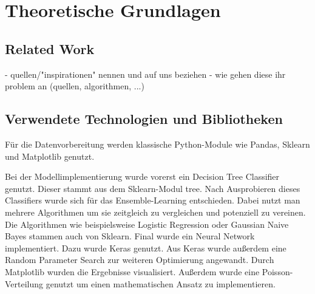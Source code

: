 \chapter{Theoretische Grundlagen}

\section{Related Work}
- quellen/"inspirationen" nennen und auf uns beziehen
- wie gehen diese ihr problem an (quellen, algorithmen, ...)

\section{Verwendete Technologien und Bibliotheken}
Für die Datenvorbereitung werden klassische Python-Module wie Pandas, Sklearn und Matplotlib genutzt.

Bei der Modellimplementierung wurde vorerst ein Decision Tree Classifier genutzt. Dieser stammt aus dem Sklearn-Modul tree. Nach Ausprobieren dieses Classifiers wurde sich für das Ensemble-Learning entschieden. Dabei nutzt man mehrere Algorithmen um sie zeitgleich zu vergleichen und potenziell zu vereinen. Die Algorithmen wie beispielsweise Logistic Regression oder Gaussian Naive Bayes stammen auch von Sklearn. Final wurde ein Neural Network implementiert. Dazu wurde Keras genutzt. Aus Keras wurde außerdem eine Random Parameter Search zur weiteren Optimierung angewandt. Durch Matplotlib wurden die Ergebnisse visualisiert. Außerdem wurde eine Poisson-Verteilung genutzt um einen mathematischen Ansatz zu implementieren.